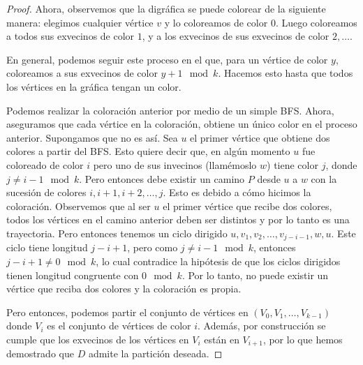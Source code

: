 \documentclass{article}
\begin{document}
\begin{enumerate}
\begin{proof}
      Ahora, observemos que la digráfica se puede colorear de la siguiente
      manera: elegimos cualquier vértice $v$ y lo coloreamos de color $0$. Luego
      coloreamos a todos sus exvecinos de color $1$, y a los exvecinos de sus
      exvecinos de color $2, \dots$.

      En general, podemos seguir este proceso en el
      que, para un vértice de color $y$, coloreamos a sus exvecinos de color
      $y+1 \mod k$. Hacemos esto hasta que todos los vértices en la gráfica
      tengan un color.

      Podemos realizar la coloración anterior por medio de un simple BFS. Ahora,
      aseguramos que cada vértice en la coloración, obtiene un único color en el
      proceso anterior. Supongamos que no es así. Sea $u$ el primer vértice que obtiene
      dos colores a partir del BFS. Esto quiere decir que, en algún momento $u$ fue coloreado de
      color $i$ pero uno de sus invecinos (llamémoslo $w$) tiene color $j$, donde $j \neq i-1
      \mod k$. Pero entonces debe existir un camino $P$ desde $u$ a $w$ con la
      sucesión de colores $i, i+1, i+2, \dots, j$. Esto es debido a cómo hicimos
      la coloración. Observemos que al ser $u$ el primer vértice que recibe dos
      colores, todos los vértices en el camino anterior deben ser distintos y
      por lo tanto es una trayectoria. Pero entonces tenemos un ciclo dirigido
      $u, v_1, v_2, \dots, v_{j-i-1}, w, u$. Este ciclo tiene longitud $j-i+1$,
      pero como $j \neq i-1 \mod k$, entonces $j-i+1 \neq 0 \mod k$, lo cual
      contradice la hipótesis de que los ciclos dirigidos tienen longitud
      congruente con $0 \mod k$. Por lo tanto, no puede existir un vértice que
      reciba dos colores y la coloración es propia.

      Pero entonces, podemos partir el conjunto de vértices en $(V_0, V_1, \dots,
      V_{k-1})$ donde $V_i$ es el conjunto de vértices de color $i$. Además, por
      construcción se cumple que los exvecinos de los vértices en $V_i$ están en
      $V_{i+1}$, por lo que hemos demostrado que $D$ admite la partición deseada.
    \end{proof}

    
    
  \end{enumerate}
\end{document}
